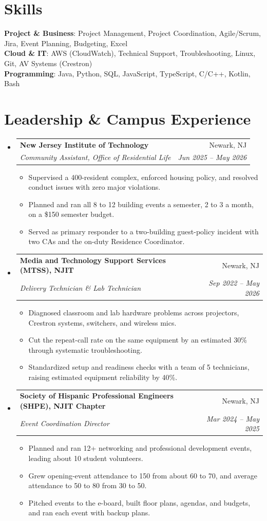 \documentclass[letterpaper,11pt]{article}
\makeatletter
\newcommand{\resumeItem}[1]{\item\small{#1}}
\newcommand{\resumeSubheading}[4]{
  \vspace{-2pt}\item
    \begin{tabular*}{0.97\textwidth}[t]{l@{\extracolsep{\fill}}r}
      \textbf{#1} & #2 \\
      \textit{\small#3} & \textit{\small #4} \\
    \end{tabular*}\vspace{-7pt}
}
\newcommand{\resumeSubHeadingListStart}{\begin{itemize}[leftmargin=0.15in, label={}, itemsep=1pt, parsep=0pt, topsep=2pt]}
\newcommand{\resumeSubHeadingListEnd}{\end{itemize}}
\newcommand{\resumeItemListStart}{\begin{itemize}[topsep=6pt,itemsep=0pt,parsep=0pt,partopsep=0pt]}
\newcommand{\resumeItemListEnd}{\end{itemize}\vspace{-5pt}}
\makeatother
\begin{document}
\section{Skills}
\begin{itemize}[leftmargin=0.15in, label={}]
    \small{\item{
      \textbf{Project \& Business}{: Project Management, Project Coordination, Agile/Scrum, Jira, Event Planning, Budgeting, Excel} \\
      \textbf{Cloud \& IT}{: AWS (CloudWatch), Technical Support, Troubleshooting, Linux, Git, AV Systems (Crestron)} \\
      \textbf{Programming}{: Java, Python, SQL, JavaScript, TypeScript, C/C++, Kotlin, Bash}
    }}
\end{itemize}

\section{Leadership \& Campus Experience}
  \resumeSubHeadingListStart
    \resumeSubheading
      {New Jersey Institute of Technology}{Newark, NJ}
      {Community Assistant, Office of Residential Life}{Jun 2025 -- May 2026}
      \resumeItemListStart
        \resumeItem{Supervised a 400-resident complex, enforced housing policy, and resolved conduct issues with zero major violations.}
        \resumeItem{Planned and ran all 8 to 12 building events a semester, 2 to 3 a month, on a \$150 semester budget.}
        \resumeItem{Served as primary responder to a two-building guest-policy incident with two CAs and the on-duty Residence Coordinator.}
      \resumeItemListEnd
    \resumeSubheading
      {Media and Technology Support Services (MTSS), NJIT}{Newark, NJ}
      {Delivery Technician \& Lab Technician}{Sep 2022 -- May 2026}
      \resumeItemListStart
        \resumeItem{Diagnosed classroom and lab hardware problems across projectors, Crestron systems, switchers, and wireless mics.}
        \resumeItem{Cut the repeat-call rate on the same equipment by an estimated 30\% through systematic troubleshooting.}
        \resumeItem{Standardized setup and readiness checks with a team of 5 technicians, raising estimated equipment reliability by 40\%.}
      \resumeItemListEnd
    \resumeSubheading
      {Society of Hispanic Professional Engineers (SHPE), NJIT Chapter}{Newark, NJ}
      {Event Coordination Director}{Mar 2024 -- May 2025}
      \resumeItemListStart
        \resumeItem{Planned and ran 12+ networking and professional development events, leading about 10 student volunteers.}
        \resumeItem{Grew opening-event attendance to 150 from about 60 to 70, and average attendance to 50 to 80 from 30 to 50.}
        \resumeItem{Pitched events to the e-board, built floor plans, agendas, and budgets, and ran each event with backup plans.}
      \resumeItemListEnd
  \resumeSubHeadingListEnd
\end{document}
